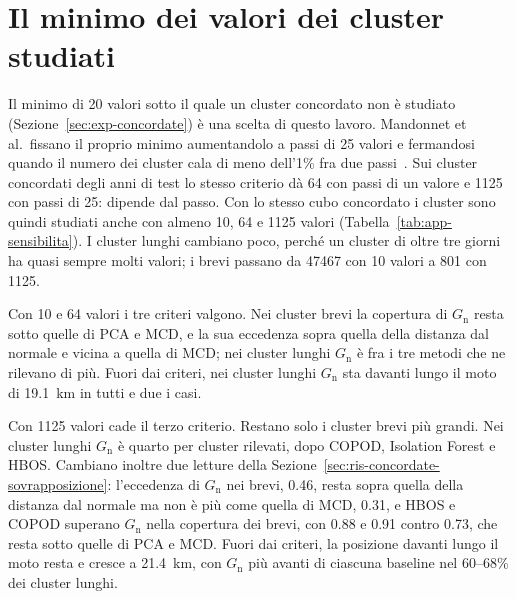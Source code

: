\FloatBarrier
\section{Il minimo dei valori dei cluster studiati}
\label{app:sens-minimo}

Il minimo di 20 valori sotto il quale un cluster concordato non è studiato (Sezione~\ref{sec:exp-concordate}) è una scelta di questo lavoro. Mandonnet et al.\ fissano il proprio minimo aumentandolo a passi di 25 valori e fermandosi quando il numero dei cluster cala di meno dell'1\% fra due passi~\cite{mandonnet2026heatwaves}. Sui cluster concordati degli anni di test lo stesso criterio dà 64 con passi di un valore e 1125 con passi di 25: dipende dal passo. Con lo stesso cubo concordato i cluster sono quindi studiati anche con almeno 10, 64 e 1125 valori (Tabella~\ref{tab:app-sensibilita}). I cluster lunghi cambiano poco, perché un cluster di oltre tre giorni ha quasi sempre molti valori; i brevi passano da 47467 con 10 valori a 801 con 1125.

Con 10 e 64 valori i tre criteri valgono. Nei cluster brevi la copertura di $G_{\mathrm{n}}$ resta sotto quelle di PCA e MCD, e la sua eccedenza sopra quella della distanza dal normale e vicina a quella di MCD; nei cluster lunghi $G_{\mathrm{n}}$ è fra i tre metodi che ne rilevano di più. Fuori dai criteri, nei cluster lunghi $G_{\mathrm{n}}$ sta davanti lungo il moto di 19.1~km in tutti e due i casi.

Con 1125 valori cade il terzo criterio. Restano solo i cluster brevi più grandi. Nei cluster lunghi $G_{\mathrm{n}}$ è quarto per cluster rilevati, dopo COPOD, Isolation Forest e HBOS. Cambiano inoltre due letture della Sezione~\ref{sec:ris-concordate-sovrapposizione}: l'eccedenza di $G_{\mathrm{n}}$ nei brevi, 0.46, resta sopra quella della distanza dal normale ma non è più come quella di MCD, 0.31, e HBOS e COPOD superano $G_{\mathrm{n}}$ nella copertura dei brevi, con 0.88 e 0.91 contro 0.73, che resta sotto quelle di PCA e MCD. Fuori dai criteri, la posizione davanti lungo il moto resta e cresce a 21.4~km, con $G_{\mathrm{n}}$ più avanti di ciascuna baseline nel 60--68\% dei cluster lunghi.


